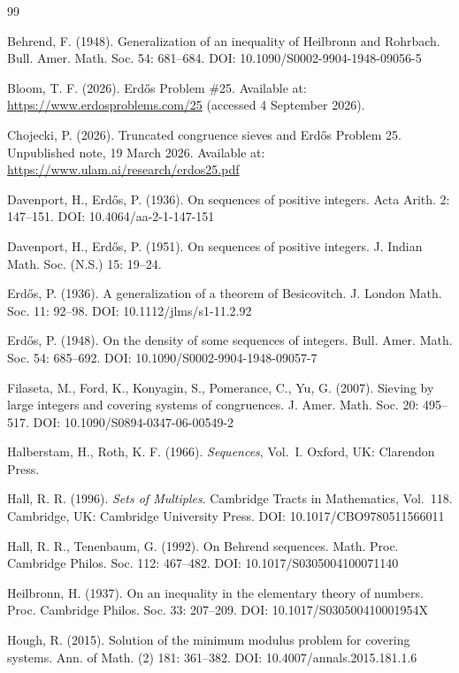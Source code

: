 \documentclass[11pt]{article}
\theoremstyle{plain}
\theoremstyle{definition}
\begin{document}
\begin{thebibliography}{99}

 Behrend, F. (1948). Generalization of an
inequality of Heilbronn and Rohrbach. Bull. Amer. Math. Soc. 54:
681--684. DOI: 10.1090/S0002-9904-1948-09056-5

 Bloom, T. F. (2026). Erd\H{o}s Problem \#25.
Available at: \url{https://www.erdosproblems.com/25} (accessed
4 September 2026).

 Chojecki, P. (2026). Truncated congruence sieves
and Erd\H{o}s Problem 25. Unpublished note, 19 March 2026.
Available at: \url{https://www.ulam.ai/research/erdos25.pdf}

 Davenport, H., Erd\H{o}s, P. (1936). On sequences
of positive integers. Acta Arith. 2: 147--151. DOI:
10.4064/aa-2-1-147-151

 Davenport, H., Erd\H{o}s, P. (1951). On sequences
of positive integers. J. Indian Math. Soc. (N.S.) 15: 19--24.

 Erd\H{o}s, P. (1936). A generalization of a theorem
of Besicovitch. J. London Math. Soc. 11: 92--98. DOI:
10.1112/jlms/s1-11.2.92

 Erd\H{o}s, P. (1948). On the density of some
sequences of integers. Bull. Amer. Math. Soc. 54: 685--692. DOI:
10.1090/S0002-9904-1948-09057-7

 Filaseta, M., Ford, K., Konyagin, S., Pomerance,
C., Yu, G. (2007). Sieving by large integers and covering systems
of congruences. J. Amer. Math. Soc. 20: 495--517. DOI:
10.1090/S0894-0347-06-00549-2

 Halberstam, H., Roth, K. F. (1966).
\emph{Sequences}, Vol.~I. Oxford, UK: Clarendon Press.

 Hall, R. R. (1996). \emph{Sets of Multiples}.
Cambridge Tracts in Mathematics, Vol.~118. Cambridge, UK:
Cambridge University Press. DOI: 10.1017/CBO9780511566011

 Hall, R. R., Tenenbaum, G. (1992). On Behrend
sequences. Math. Proc. Cambridge Philos. Soc. 112: 467--482. DOI:
10.1017/S0305004100071140

 Heilbronn, H. (1937). On an inequality in the
elementary theory of numbers. Proc. Cambridge Philos. Soc. 33:
207--209. DOI: 10.1017/S030500410001954X

 Hough, R. (2015). Solution of the minimum modulus
problem for covering systems. Ann. of Math. (2) 181: 361--382.
DOI: 10.4007/annals.2015.181.1.6


\end{thebibliography}
\end{document}
